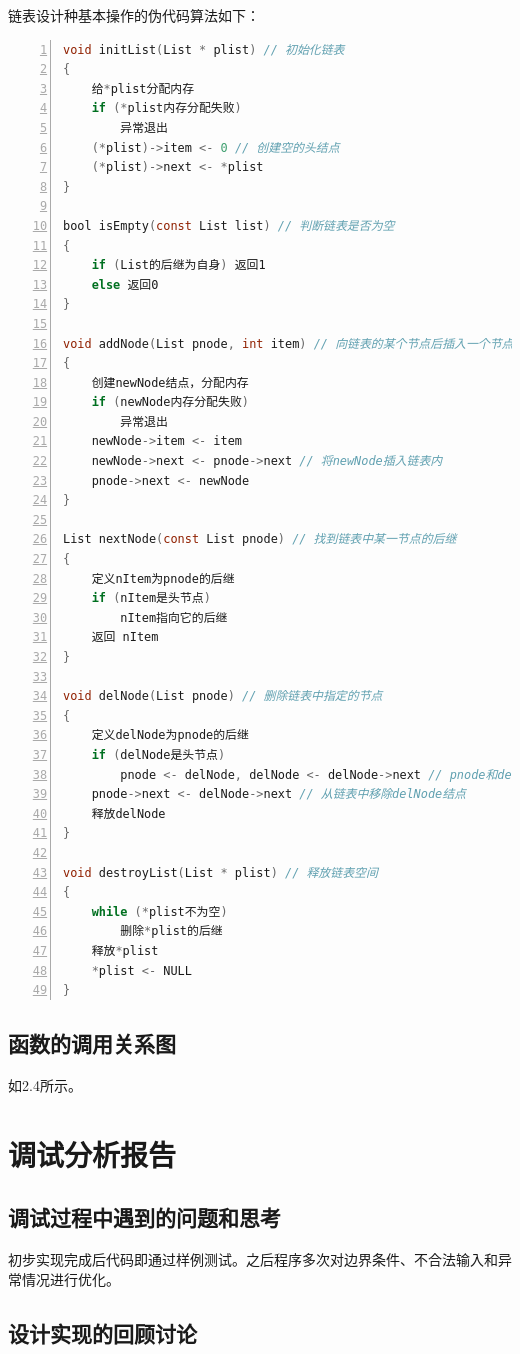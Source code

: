 \documentclass{article}
\begin{document}
链表设计种基本操作的伪代码算法如下：
\begin{lstlisting}[language={C},
    numbers=left,
    numberstyle=\tiny\menlo,
    basicstyle=\small\menlo]
void initList(List * plist) // 初始化链表
{    
    给*plist分配内存
    if (*plist内存分配失败)
        异常退出
    (*plist)->item <- 0 // 创建空的头结点
    (*plist)->next <- *plist
}

bool isEmpty(const List list) // 判断链表是否为空
{    
    if (List的后继为自身) 返回1
    else 返回0
}

void addNode(List pnode, int item) // 向链表的某个节点后插入一个节点
{    
    创建newNode结点，分配内存
    if (newNode内存分配失败)
        异常退出
    newNode->item <- item
    newNode->next <- pnode->next // 将newNode插入链表内
    pnode->next <- newNode
}

List nextNode(const List pnode) // 找到链表中某一节点的后继
{
    定义nItem为pnode的后继
    if (nItem是头节点) 
        nItem指向它的后继
    返回 nItem
}

void delNode(List pnode) // 删除链表中指定的节点
{
    定义delNode为pnode的后继
    if (delNode是头节点)
        pnode <- delNode, delNode <- delNode->next // pnode和delNode都指向他们的后继
    pnode->next <- delNode->next // 从链表中移除delNode结点
    释放delNode
}

void destroyList(List * plist) // 释放链表空间
{
    while (*plist不为空)
        删除*plist的后继
    释放*plist
    *plist <- NULL
}    
\end{lstlisting}

\subsection{函数的调用关系图}

如2.4所示。

\section{调试分析报告}

\subsection{调试过程中遇到的问题和思考}

初步实现完成后代码即通过样例测试。之后程序多次对边界条件、不合法输入和异常情况进行优化。

\subsection{设计实现的回顾讨论}
\end{document}
